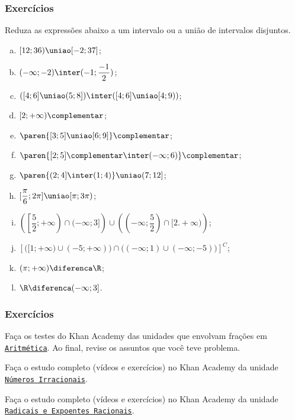 \begin{frame}
	\frametitle{Exercícios}
	
	\begin{exercicio}
		Reduza as expressões abaixo a um intervalo ou a união de intervalos disjuntos.
		\begin{enumerate}[a.]
			\item $[12; 36) \uniao [-2;37]$;
			\item $(-\infty ; -2) \inter (-1; \dfrac {-1}2)$;
			\item $([4; 6] \uniao (5; 8]) \inter ([4; 6] \uniao [4; 9))$;
			\item $[2; + \infty)\complementar$;
			\item $\paren{[3;5] \uniao [6;9]}\complementar$;
			\item $\paren{[2;5]\complementar \inter (-\infty ; 6)}\complementar$;
			\item $\paren{(2;4] \inter (1;4)} \uniao (7;12]$;
			\item $[\dfrac \pi 6 ; 2 \pi] \uniao [\pi ; 3 \pi)$;
			\item $\left( \left[\dfrac 5 2; +\infty \right) \cap (- \infty; 3] \right) \cup \left( \left(- \infty ; \dfrac 5 2 \right) \cap [2. + \infty ) \right)$;
			\item $\left[ \big( [1; +\infty) \cup (-5; +\infty) \big) \cap \big( (- \infty ; 1) \cup ( - \infty ; -5) \big)\right]^C$;
			\item $( \pi ; + \infty) \diferenca \R$;
			\item $\R \diferenca (-\infty ; 3]$.
		\end{enumerate}
	\end{exercicio}
\end{frame}


\begin{frame}
	\frametitle{Exercícios}
	
	\begin{exercicio}
		Faça os testes do Khan Academy das unidades que envolvam frações em
\href{https://pt.khanacademy.org/math/arithmetic}
{{\tt Aritmética}}. Ao final, revise os assuntos que você teve
problema. 
	\end{exercicio}

	\begin{exercicio}
		Faça o estudo completo (vídeos e exercícios) no Khan Academy da unidade
\href{https://pt.khanacademy.org/math/algebra/x2f8bb11595b61c86:irrational-numbers}
{{\tt Números Irracionais}}.
	\end{exercicio}

	\begin{exercicio}
		Faça o estudo completo (vídeos e exercícios) no Khan Academy da unidade
\href{https://pt.khanacademy.org/math/algebra2/x2ec2f6f830c9fb89:exp}
{{\tt Radicais e Expoentes Racionais}}.
	\end{exercicio}
\end{frame}


